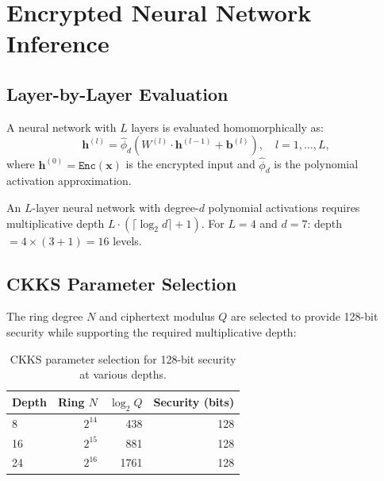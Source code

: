 \section{Encrypted Neural Network Inference}

\label{sec:nn}

\subsection{Layer-by-Layer Evaluation}

A neural network with $L$ layers is evaluated homomorphically as:
\begin{equation}
\mathbf{h}^{(l)} = \hat{\phi}_d\!\left(W^{(l)} \cdot \mathbf{h}^{(l-1)} +
\mathbf{b}^{(l)}\right), \quad l = 1, \ldots, L,
\end{equation}
where $\mathbf{h}^{(0)} = \texttt{Enc}(\mathbf{x})$ is the encrypted input
and $\hat{\phi}_d$ is the polynomial activation approximation.

\begin{lemma}
An $L$-layer neural network with degree-$d$ polynomial activations requires
multiplicative depth $L \cdot (\lceil\log_2 d\rceil + 1)$. For $L = 4$ and
$d = 7$: depth $= 4 \times (3 + 1) = 16$ levels.
\end{lemma}

\subsection{CKKS Parameter Selection}

The ring degree $N$ and ciphertext modulus $Q$ are selected to provide 128-bit
security while supporting the required multiplicative depth:

\begin{table}[H]
\centering
\small
\begin{tabular}{lrrr}
\toprule
\textbf{Depth} & \textbf{Ring $N$} & \textbf{$\log_2 Q$} & \textbf{Security (bits)} \\
\midrule
8 & $2^{14}$ & 438 & 128 \\
16 & $2^{15}$ & 881 & 128 \\
24 & $2^{16}$ & 1761 & 128 \\
\bottomrule
\end{tabular}
\caption{CKKS parameter selection for 128-bit security at various depths.}
\label{tab:params}
\end{table}


